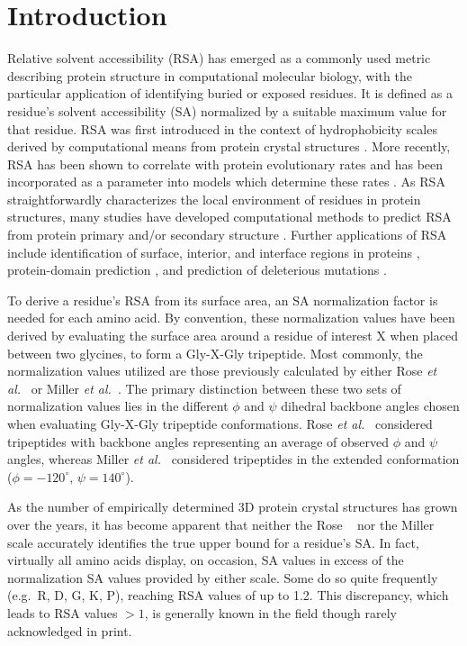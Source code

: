 \documentclass[11pt]{article}
\begin{document}
\section*{Introduction}

Relative solvent accessibility (RSA) has emerged as a commonly used metric describing protein structure in computational molecular biology, with the particular application of identifying buried or exposed residues. It is defined as a residue's solvent accessibility (SA) normalized by a suitable maximum value for that residue.  RSA was first introduced in the context of hydrophobicity scales derived by computational means from protein crystal structures \cite{Chothia1976,Rose1985,Miller1987,Moelbert2004,Shaytan2009}. More recently, RSA has been shown to correlate with protein evolutionary rates and has been incorporated as a parameter into models which determine these rates \cite{Goldmanetal1998,Bloometal2006,FranzosaXia2009,Zhouetal2009,FranzosaXia2012,Scherrer2012,MeyerWilke2012,ConantStadler2009}. As RSA straightforwardly characterizes the local environment of residues in protein structures, many studies have developed computational methods to predict RSA from protein primary and/or secondary structure \cite{RostSander1994,Pollastrietal2002,KimPark2004,NguyenRajapakse2005}. Further applications of RSA include identification of surface, interior, and interface regions in proteins \cite{Levy2010}, protein-domain prediction \cite{Chengetal2006}, and prediction of deleterious mutations \cite{ChenZhou2005}.
 
To derive a residue's RSA from its surface area, an SA normalization factor is needed for each amino acid. By convention, these normalization values have been derived by evaluating the surface area around a residue of interest X when placed between two glycines, to form a Gly-X-Gly tripeptide. Most commonly, the normalization values utilized are those previously calculated by either Rose \emph{et al.}~\cite{Rose1985} or Miller \emph{et al.}~\cite{Miller1987}. The primary distinction between these two sets of normalization values lies in the different $\phi$ and $\psi$ dihedral backbone angles chosen when evaluating Gly-X-Gly tripeptide conformations. Rose \emph{et al.}~\cite{Rose1985} considered tripeptides with backbone angles representing an average of observed $\phi$ and $\psi$ angles, whereas Miller \emph{et al.}~\cite{Miller1987} considered tripeptides in the extended conformation ($\phi= -120^\circ$, $\psi=140^\circ$).

As the number of empirically determined 3D protein crystal structures has grown over the years, it has become apparent that neither the Rose ~\cite{Rose1985} nor the Miller ~\cite{Miller1987} scale accurately identifies the true upper bound for a residue's SA. In fact, virtually all amino acids display, on occasion, SA values in excess of the normalization SA values provided by either scale. Some do so quite frequently (e.g.\ R, D, G, K, P), reaching RSA values of up to 1.2. This discrepancy, which leads to RSA values $>1$, is generally known in the field though rarely acknowledged in print.
\end{document}
